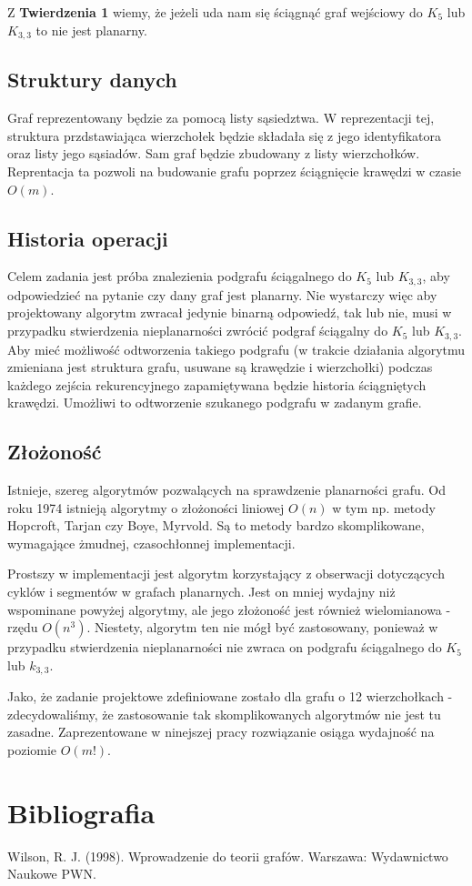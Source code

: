 \documentclass[a4 122pt]{article}
\begin{document}
		Z \textbf{Twierdzenia 1} wiemy, że jeżeli uda nam się ściągnąć graf wejściowy do $K_5$ lub $K_{3,3}$ to nie jest planarny. 
	
	\subsection{Struktury danych}

		Graf reprezentowany będzie za pomocą listy sąsiedztwa. W reprezentacji tej, struktura przdstawiająca wierzchołek będzie składała się 
		z jego identyfikatora oraz listy jego sąsiadów. Sam graf będzie zbudowany z listy wierzchołków. Reprentacja ta pozwoli na budowanie
		grafu poprzez ściągnięcie krawędzi w czasie $O(m)$.
	
	\subsection{Historia operacji}
		Celem zadania jest próba znalezienia podgrafu ściągalnego do $K_5$ lub $K_{3,3}$, aby odpowiedzieć na pytanie czy dany graf jest planarny. 
		Nie wystarczy więc aby projektowany algorytm zwracał jedynie binarną odpowiedź, tak lub nie, musi w przypadku stwierdzenia nieplanarności zwrócić 
		podgraf ściągalny do $K_5$ lub $K_{3,3}$.
		Aby mieć możliwość odtworzenia takiego podgrafu (w trakcie działania algorytmu zmieniana jest struktura grafu, usuwane są krawędzie i wierzchołki) 
		podczas każdego zejścia rekurencyjnego zapamiętywana będzie historia ściągniętych krawędzi. Umożliwi to odtworzenie szukanego podgrafu 
		w zadanym grafie.
	
	\subsection{Złożoność}
	
		Istnieje, szereg algorytmów pozwalących na sprawdzenie planarności grafu.
		Od roku 1974 istnieją algorytmy o złożoności liniowej $O(n)$ w tym np. metody Hopcroft, Tarjan czy Boye, Myrvold. Są to metody bardzo skomplikowane, wymagające żmudnej, czasochłonnej implementacji.
		
		Prostszy w implementacji jest algorytm korzystający z obserwacji dotyczących cyklów i segmentów w grafach planarnych. Jest on mniej wydajny niż wspominane
		powyżej algorytmy, ale jego złożoność jest również wielomianowa - rzędu $O(n^3)$. Niestety, algorytm ten nie mógł być zastosowany, ponieważ w przypadku
		stwierdzenia nieplanarności nie zwraca on podgrafu ściągalnego do $K_5$ lub $k_{3, 3}$.
		
		Jako, że zadanie projektowe zdefiniowane zostało dla grafu o 12 wierzchołkach - zdecydowaliśmy, że zastosowanie tak skomplikowanych algorytmów nie jest tu zasadne. 
		Zaprezentowane w ninejszej pracy rozwiązanie osiąga wydajność na poziomie $O(m!)$.

	\section{Bibliografia}

		Wilson, R. J. (1998). Wprowadzenie do teorii grafów. Warszawa: Wydawnictwo Naukowe PWN.
\end{document}
